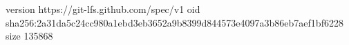 version https://git-lfs.github.com/spec/v1
oid sha256:2a31da5c24cc980a1ebd3eb3652a9b8399d844573e4097a3b86eb7aef1bf6228
size 135868
